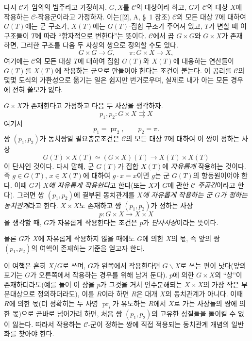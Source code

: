 다시 $\mathcal C$가 임의의 범주라고 가정하자. $G,X$를 $\mathcal C$의
대상이라 하고, $G$가 $\mathcal C$의 대상 $X$에 작용하는
$\mathcal C$-작용군이라고 가정하자. 이는([2], A, \S~1 참조) $\mathcal
C$의 모든 대상 $T$에 대하여 $G(T)$에는 군 구조가, $X(T)$에는
$G(T)$-집합 구조가 주어져 있고, $T$가 변할 때 이 구조들이 $T$에 따라
``함자적으로 변한다''는 뜻이다. $\mathcal C$에서 곱 $G\times G$와
$G\times X$가 존재하면, 그러한 구조를 다음 두 사상의 쌍으로 정의할
수도 있다.
\[
  G\times G\longrightarrow G,
  \qquad \pi:G\times X\longrightarrow X,
\]
여기에는 $\mathcal C$의 모든 대상 $T$에 대하여 집합 $G(T)$와 $X(T)$에
대응하는 연산들이 $G(T)$를 $X(T)$에 작용하는 군으로 만들어야 한다는
조건이 붙는다. 이 공리를 $\mathcal C$의 몇몇 도식의 가환성으로 옮기는
일은 쉽지만 번거로우며, 실제로 내가 아는 모든 경우에 전혀 쓸모가 없다.

$G\times X$가 존재한다고 가정하고 다음 두 사상을 생각하자.
\[
  p_1,p_2:G\times X\rightrightarrows X
\]
여기서
\[
  p_1=\operatorname{pr}_2,\qquad p_2=\pi.
\]
쌍 $(p_1,p_2)$가 동치쌍일 필요충분조건은 $\mathcal C$의 모든 대상
$T$에 대하여 이 쌍이 정하는 사상
\[
  G(T)\times X(T)\simeq(G\times X)(T)
  \longrightarrow X(T)\times X(T)
\]
이 단사인 것이다. 다시 말해, 군 $G(T)$가 집합 $X(T)$에
\emph{자유롭게} 작용하는 것이다. 즉 $g\in G(T)$, $x\in X(T)$에 대하여
$g\cdot x=x$이면 $g$는 군 $G(T)$의 항등원이어야 한다. 이때 $G$가
\emph{$X$에 자유롭게 작용한다}고 한다(또는 $X$가 $G$에 관한
\emph{$\mathcal C$-주공간}이라고 한다). 그러면 쌍 $(p_1,p_2)$에 결부된
동치관계를 \emph{$X$에 자유롭게 작용하는 군 $G$가 정하는 동치관계}라고
한다. $X\times X$도 존재하고 쌍 $(p_1,p_2)$가 정하는 사상
\[
  p:G\times X\longrightarrow X\times X
\]
을 생각할 때, $G$가 자유롭게 작용한다는 조건은 $p$가
\emph{단사사상}이라는 뜻이다.

물론 $G$가 $X$에 자유롭게 작용하지 않을 때에도 $G$에 의한 $X$의 몫,
즉 앞의 쌍 $(p_1,p_2)$의 여핵이 존재하는 기준을 얻고자 한다.

이 여핵은 흔히 $X/G$로 쓰며, $G$가 왼쪽에서 작용한다면 $G\backslash
X$로 쓰는 편이 낫다(앞의 표기는 $G$가 오른쪽에서 작용하는 경우를 위해
남겨 둔다). $p$에 의한 $G\times X$의 ``상''이 존재하더라도(예를 들어
이 상을 $p$가 그것을 거쳐 인수분해되는 $X\times X$의 가장 작은
부분대상으로 정의하더라도), 이를 $R$이라 하면 $R$은 대개 $X$의
동치관계가 아니다. 이때 $R$에 의한 몫(더 정확히는 두 사영
$\operatorname{pr}_i$가 유도하는 $R$에서 $X$로 가는 사상들의 쌍에 의한
몫)으로 곧바로 넘어가려 하면, 처음 쌍 $(p_1,p_2)$의 고유한 성질들을
돌이킬 수 없이 잃는다. 따라서 작용하는 $\mathcal C$-군이 정하는 쌍에
직접 적용되는 동치관계 개념의 일반화를 찾아야 한다.

